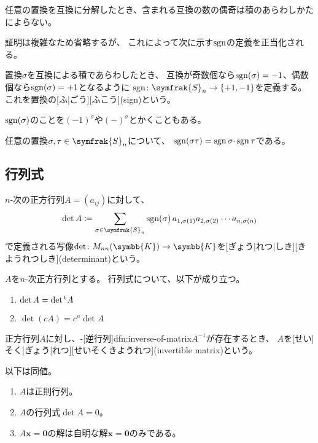\documentclass[../sotsu.tex]{subfiles}
\begin{document}
\begin{proposition}
    \label{thm:parity-of-permutation}
    任意の置換を互換に分解したとき、含まれる互換の数の偶奇は積のあらわしかたによらない。
\end{proposition}

証明は複雑なため省略するが、
これによって次に示す$\operatorname{sgn}$の定義を正当化される。

\begin{definition}
    \label{dfn:sign-of-permutation}
    置換$\sigma$を互換による積であらわしたとき、
    互換が奇数個なら$\operatorname{sgn}(\sigma) = -1$、偶数個なら$\operatorname{sgn}(\sigma) = +1$となるように
    $\sgn \colon \symfrak{S}_n \to \{ +1, -1 \}$を定義する。
    これを置換の[ふ|ごう][ふこう](sign)という。
\end{definition}

$\operatorname{sgn}(\sigma)$のことを$(-1)^\sigma$や$(-)^\sigma$とかくこともある。

\begin{corollary}
    任意の置換$\sigma, \tau \in \symfrak{S}_n$について、
    $\operatorname{sgn}(\sigma \tau) = \operatorname{sgn} \sigma \cdotp \operatorname{sgn} \tau$である。
\end{corollary}



\subsection{行列式}

\begin{definition}
    $n$-次の正方行列$A = (a_{ij})$に対して、
    \begin{equation}
        \det A  \coloneq  \sum_{\sigma \in \symfrak{S}_n} \sgn(\sigma) \, a_{1, \sigma(1)} a_{2, \sigma(2)} \dotsm a_{n, \sigma(n)} 
    \end{equation}
    で定義される写像$\det \colon M_{nn}(\symbb{K}) \to \symbb{K}$を[ぎょう|れつ|しき][きようれつしき](determinant)という。
\end{definition}

\begin{proposition}
    $A$を$n$-次正方行列とする。
    行列式について、以下が成り立つ。
    \begin{enumerate}
        \item $\det A = \det {}^{\mathrm{t}}A$
        \item $\det (cA) = c^n \det A$
    \end{enumerate}
\end{proposition}

\begin{definition}
    \label{dfn:invertible-matrix}
    正方行列$A$に対し、-[逆行列]{dfn:inverse-of-matrix}$A^{-1}$が存在するとき、
    $A$を[せい|そく|ぎょう|れつ][せいそくきようれつ](invertible matrix)という。
\end{definition}

\begin{proposition}
    以下は同値。
    \begin{enumerate}
        \item $A$は正則行列。
        \item $A$の行列式$\det A = 0$。
        \item $A \symbf{x} = \symbf{0}$の解は自明な解$\symbf{x} = \symbf{0}$のみである。
    \end{enumerate}
\end{proposition}
\end{document}
